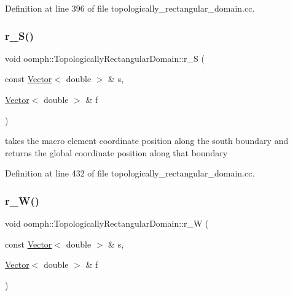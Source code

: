 Definition at line 396 of file topologically\+\_\+rectangular\+\_\+domain.\+cc.

\mbox{\label{classoomph_1_1TopologicallyRectangularDomain_a76ea308be7a90143fe728fc4799d584b}} 
\subsubsection{\texorpdfstring{r\+\_\+\+S()}{r\_S()}}
{\footnotesize\ttfamily void oomph\+::\+Topologically\+Rectangular\+Domain\+::r\+\_\+S (\begin{DoxyParamCaption}\item[{const \hyperlink{classoomph_1_1Vector}{Vector}$<$ double $>$ \&}]{s,  }\item[{\hyperlink{classoomph_1_1Vector}{Vector}$<$ double $>$ \&}]{f }\end{DoxyParamCaption})\hspace{0.3cm}{\ttfamily [private]}}



takes the macro element coordinate position along the south boundary and returns the global coordinate position along that boundary 



Definition at line 432 of file topologically\+\_\+rectangular\+\_\+domain.\+cc.

\mbox{\label{classoomph_1_1TopologicallyRectangularDomain_aa56f73a53b028997929605e71eab6e2d}} 
\subsubsection{\texorpdfstring{r\+\_\+\+W()}{r\_W()}}
{\footnotesize\ttfamily void oomph\+::\+Topologically\+Rectangular\+Domain\+::r\+\_\+W (\begin{DoxyParamCaption}\item[{const \hyperlink{classoomph_1_1Vector}{Vector}$<$ double $>$ \&}]{s,  }\item[{\hyperlink{classoomph_1_1Vector}{Vector}$<$ double $>$ \&}]{f }\end{DoxyParamCaption})\hspace{0.3cm}{\ttfamily [private]}}



